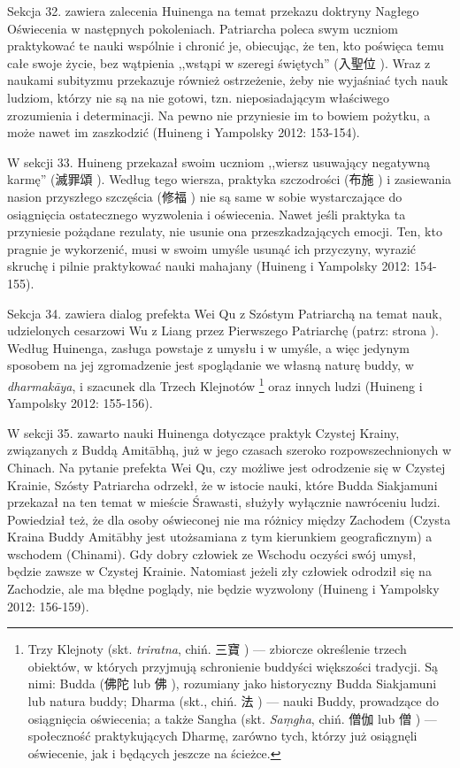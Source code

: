 Sekcja 32. zawiera zalecenia Huinenga na temat przekazu doktryny Nagłego Oświecenia w następnych pokoleniach.
Patriarcha poleca swym uczniom praktykować te nauki wspólnie i chronić je, obiecując, że ten, kto poświęca temu całe swoje życie, bez wątpienia ,,wstąpi w szeregi świętych'' (入聖位 ).
Wraz z naukami subityzmu przekazuje również ostrzeżenie, żeby nie wyjaśniać tych nauk ludziom, którzy nie są na nie gotowi, tzn. nieposiadającym właściwego zrozumienia i determinacji.
Na pewno nie przyniesie im to bowiem pożytku, a może nawet im zaszkodzić
(Huineng i Yampolsky 2012: 153-154).

W sekcji 33. Huineng przekazał swoim uczniom ,,wiersz usuwający negatywną karmę'' (滅罪頌 ).
Według tego wiersza, praktyka szczodrości (布施 ) i zasiewania nasion przyszłego szczęścia (修福 ) nie są same w sobie wystarczające do osiągnięcia ostatecznego wyzwolenia i oświecenia.
Nawet jeśli praktyka ta przyniesie pożądane rezulaty, nie usunie ona przeszkadzających emocji.
Ten, kto pragnie je wykorzenić, musi w swoim umyśle usunąć ich przyczyny, wyrazić skruchę i pilnie praktykować nauki mahajany
(Huineng i Yampolsky 2012: 154-155).

Sekcja 34. zawiera dialog prefekta Wei Qu z Szóstym Patriarchą na temat nauk, udzielonych cesarzowi Wu z Liang przez Pierwszego Patriarchę (patrz: strona \pageref{LiangWuDi}).
Według Huinenga, zasługa powstaje z umysłu i w umyśle, a więc jedynym sposobem na jej zgromadzenie jest spoglądanie we własną naturę buddy, w \textit{dharmakāya}, i szacunek dla Trzech Klejnotów%
\footnote{Trzy Klejnoty (skt. \textit{triratna}, chiń. 三寶 ) --- zbiorcze określenie trzech obiektów, w których przyjmują schronienie buddyści większości tradycji. Są nimi: Budda (佛陀  lub 佛 ), rozumiany jako historyczny Budda Siakjamuni lub natura buddy; Dharma (skt., chiń. 法 ) --- nauki Buddy, prowadzące do osiągnięcia oświecenia; a także Sangha (skt. \textit{Sa\d{m}gha}, chiń. 僧伽  lub 僧 ) --- społeczność praktykujących Dharmę, zarówno tych, którzy już osiągnęli oświecenie, jak i będących jeszcze na ścieżce.}
oraz innych ludzi
(Huineng i Yampolsky 2012: 155-156).

W sekcji 35. zawarto nauki Huinenga dotyczące praktyk Czystej Krainy, związanych z Buddą Amitābhą, już w jego czasach szeroko rozpowszechnionych w Chinach.
Na pytanie prefekta Wei Qu, czy możliwe jest odrodzenie się w Czystej Krainie, Szósty Patriarcha odrzekł, że w istocie nauki, które Budda Siakjamuni przekazał na ten temat w mieście Śrawasti, służyły wyłącznie nawróceniu ludzi.
Powiedział też, że dla osoby oświeconej nie ma różnicy między Zachodem (Czysta Kraina Buddy Amitābhy jest utożsamiana z tym kierunkiem geograficznym) a wschodem (Chinami).
Gdy dobry człowiek ze Wschodu oczyści swój umysł, będzie zawsze w Czystej Krainie.
Natomiast jeżeli zły człowiek odrodził się na Zachodzie, ale ma błędne poglądy, nie będzie wyzwolony
(Huineng i Yampolsky 2012: 156-159).

